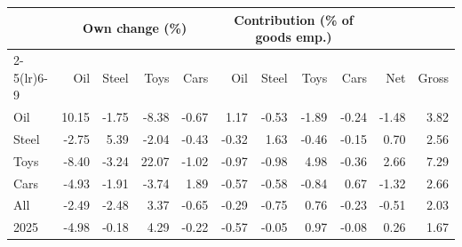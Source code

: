 \begin{tabular}{lrrrrrrrrrr}
\toprule
 & \multicolumn{4}{c}{Own change (\%)} & \multicolumn{4}{c}{Contribution (\% of goods emp.)} & & \\
\cmidrule(lr){2-5}\cmidrule(lr){6-9}
 & Oil & Steel & Toys & Cars & Oil & Steel & Toys & Cars & Net & Gross \\
\midrule
Oil & 10.15 & -1.75 & -8.38 & -0.67 & 1.17 & -0.53 & -1.89 & -0.24 & -1.48 & 3.82 \\
Steel & -2.75 & 5.39 & -2.04 & -0.43 & -0.32 & 1.63 & -0.46 & -0.15 & 0.70 & 2.56 \\
Toys & -8.40 & -3.24 & 22.07 & -1.02 & -0.97 & -0.98 & 4.98 & -0.36 & 2.66 & 7.29 \\
Cars & -4.93 & -1.91 & -3.74 & 1.89 & -0.57 & -0.58 & -0.84 & 0.67 & -1.32 & 2.66 \\
All & -2.49 & -2.48 & 3.37 & -0.65 & -0.29 & -0.75 & 0.76 & -0.23 & -0.51 & 2.03 \\
2025 & -4.98 & -0.18 & 4.29 & -0.22 & -0.57 & -0.05 & 0.97 & -0.08 & 0.26 & 1.67 \\
\bottomrule
\end{tabular}
